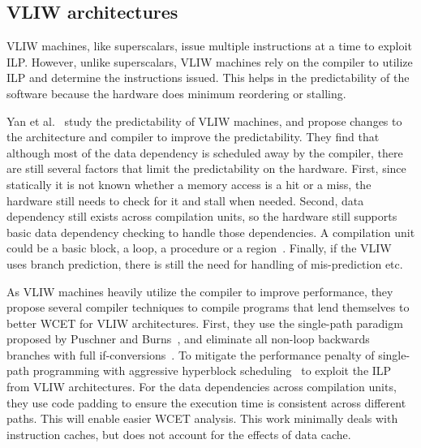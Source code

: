 
\subsection{VLIW architectures}
\label{sec:RTVLIW}
VLIW machines, like superscalars, issue multiple instructions at a time to exploit ILP.
However, unlike superscalars, VLIW machines rely on the compiler to utilize ILP and determine the instructions issued.  
This helps in the predictability of the software because the hardware does minimum reordering or stalling.
 
Yan et al.~\cite{Yan2008VLIW} study the predictability of VLIW machines, and propose changes to the architecture and compiler to improve the predictability. 
They find that although most of the data dependency is scheduled away by the compiler, there are still several factors that limit the predictability on the hardware. 
First, since statically it is not known whether a memory access is a hit or a miss, the hardware still needs to check for it and stall when needed. 
Second, data dependency still exists across compilation units, so the hardware still supports basic data dependency checking to handle those dependencies.
A compilation unit could be a basic block, a loop, a procedure or a region~\cite{Hank:1995:RCI:225160.225189}. 
Finally, if the VLIW uses branch prediction, there is still the need for handling of mis-prediction etc.

As VLIW machines heavily utilize the compiler to improve performance, they propose several compiler techniques to compile programs that lend themselves to better WCET for VLIW architectures. 
First, they use the single-path paradigm proposed by Puschner and Burns~\cite{Puschner:2002:WTP:882515.885528}, and eliminate all non-loop backwards branches with full if-conversions~\cite{Allen:1983:CCD:567067.567085}.  
To mitigate the performance penalty of single-path programming with aggressive hyperblock scheduling~\cite{Mahlke:1992:ECS:144953.144998} to exploit the ILP from VLIW architectures. 
For the data dependencies across compilation units, they use code padding to ensure the execution time is consistent across different paths.    
This will enable easier WCET analysis. 
This work minimally deals with instruction caches, but does not account for the effects of data cache. 

